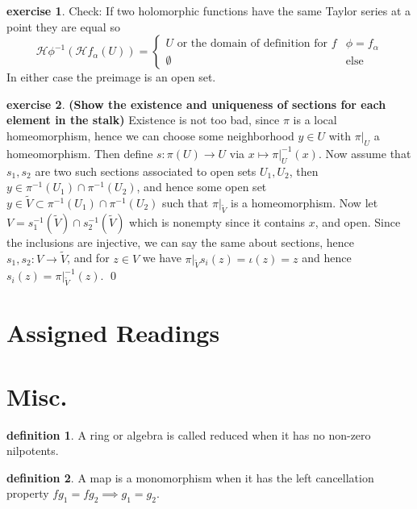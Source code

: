 \documentclass[10.5pt]{article}
\theoremstyle{definition}
\newtheorem{exe}{exercise}
\newtheorem{definition}{definition}
\newcommand{\tor}{\text{ or }}
\begin{document}
\begin{exe}
        \makeatletter{}\makeatother \label{check Holomorphic as sections exe}Check: If two holomorphic functions have the same Taylor series at a point they are equal so \[\mathcal{H}\phi^{-1} (\mathcal{H}f_\alpha(U)) = \begin{cases}
        U \tor \text{the domain of definition for }f &\phi = f_\alpha \\
        \emptyset &\text{else}
        \end{cases}\]
        In either case the preimage is an open set.
    \end{exe}
    \begin{exe}\label{Existence and uniqueness sections on stalks}
        \textbf{(Show the existence and uniqueness of sections for each element in the stalk)}
        Existence is not too bad, since \(\pi\) is a local homeomorphism, hence we can choose some neighborhood \(y \in U\) with \(\pi\vert_U\) a homeomorphism. Then define \(s: \pi(U) \to U\) via \(x \mapsto \pi\vert_U^{-1}(x)\). Now assume that \(s_1,s_2\) are two such sections associated to open sets \(U_1,U_2\), then \(y \in \pi^{-1}(U_1) \cap \pi^{-1}(U_2)\), and hence some open set \(y \in \tilde{V} \subset \pi^{-1}(U_1) \cap \pi^{-1}(U_2)\) such that \(\pi\vert_{\tilde{V}}\) is a homeomorphism. Now let \(V = s_1^{-1}(\tilde{V}) \cap s_2^{-1}(\tilde{V})\) which is nonempty since it contains \(x\), and open. Since the inclusions are injective, we can say the same about sections, hence \(s_1,s_2:  V \to \tilde{V}\), and for \(z \in V\) we have \(\pi\vert_{\tilde{V}}s_i(z) = \iota(z) = z\) and hence \(s_i(z) = \pi\vert_{\tilde{V}}^{-1}(z)\). \qed
    \end{exe}
    


    \appendix
    
    \section{Assigned Readings}

    \section{Misc.}
    \begin{definition}
        A ring or algebra is called reduced when it has no non-zero nilpotents.
    \end{definition}
    \begin{definition}
        A map is a monomorphism when it has the left cancellation property \(fg_1 = fg_2 \implies g_1 = g_2\).
    \end{definition}
\end{document}
